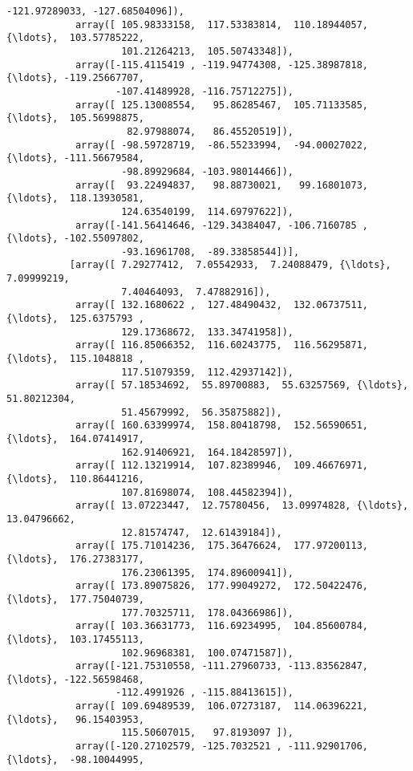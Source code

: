 \documentclass[11pt]{article}
\begin{document}
\begin{Verbatim}[commandchars=\\\{\}]
                   -121.97289033, -127.68504096]),
            array([ 105.98333158,  117.53383814,  110.18944057, {\ldots},  103.57785222,
                    101.21264213,  105.50743348]),
            array([-115.4115419 , -119.94774308, -125.38987818, {\ldots}, -119.25667707,
                   -107.41489928, -116.75712275]),
            array([ 125.13008554,   95.86285467,  105.71133585, {\ldots},  105.56998875,
                     82.97988074,   86.45520519]),
            array([ -98.59728719,  -86.55233994,  -94.00027022, {\ldots}, -111.56679584,
                    -98.89929684, -103.98014466]),
            array([  93.22494837,   98.88730021,   99.16801073, {\ldots},  118.13930581,
                    124.63540199,  114.69797622]),
            array([-141.56414646, -129.34384047, -106.7160785 , {\ldots}, -102.55097802,
                    -93.16961708,  -89.33858544])],
           [array([ 7.29277412,  7.05542933,  7.24088479, {\ldots},  7.09999219,
                    7.40464093,  7.47882916]),
            array([ 132.1680622 ,  127.48490432,  132.06737511, {\ldots},  125.6375793 ,
                    129.17368672,  133.34741958]),
            array([ 116.85066352,  116.60243775,  116.56295871, {\ldots},  115.1048818 ,
                    117.51079359,  112.42937142]),
            array([ 57.18534692,  55.89700883,  55.63257569, {\ldots},  51.80212304,
                    51.45679992,  56.35875882]),
            array([ 160.63399974,  158.80418798,  152.56590651, {\ldots},  164.07414917,
                    162.91406921,  164.18428597]),
            array([ 112.13219914,  107.82389946,  109.46676971, {\ldots},  110.86441216,
                    107.81698074,  108.44582394]),
            array([ 13.07223447,  12.75780456,  13.09974828, {\ldots},  13.04796662,
                    12.81574747,  12.61439184]),
            array([ 175.71014236,  175.36476624,  177.97200113, {\ldots},  176.27383177,
                    176.23061395,  174.89600941]),
            array([ 173.89075826,  177.99049272,  172.50422476, {\ldots},  177.75040739,
                    177.70325711,  178.04366986]),
            array([ 103.36631773,  116.69234995,  104.85600784, {\ldots},  103.17455113,
                    102.96968381,  100.07471587]),
            array([-121.75310558, -111.27960733, -113.83562847, {\ldots}, -122.56598468,
                   -112.4991926 , -115.88413615]),
            array([ 109.69489539,  106.07273187,  114.06396221, {\ldots},   96.15403953,
                    115.50607015,   97.8193097 ]),
            array([-120.27102579, -125.7032521 , -111.92901706, {\ldots},  -98.10044995,

\end{Verbatim}
\end{document}
